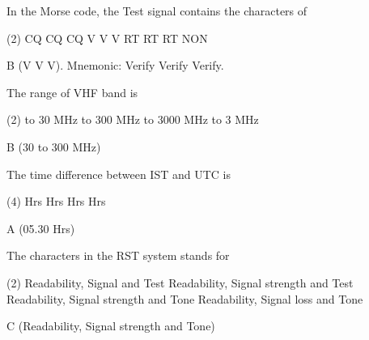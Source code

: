 \documentclass[a4paper]{article}
\begin{document}
\begin{question}In the Morse code, the Test signal contains the characters of \spaces
	\begin{tasks}(2)
		\task CQ CQ CQ
		\task V V V
		\task RT RT RT
		\task NON
	\end{tasks}
\end{question}

\begin{solution}
	B (V V V). Mnemonic: Verify Verify Verify.
\end{solution}

\vspace{5mm}



\begin{question}The range of VHF band is \spaces
	\begin{tasks}(2)
		 to 30 MHz
		 to 300 MHz
		 to 3000 MHz
		 to 3 MHz
	\end{tasks}
\end{question}

\begin{solution}
B (30 to 300 MHz)
\end{solution}

\vspace{5mm}



\begin{question}The time difference between IST and UTC is \spaces
	\begin{tasks}(4)
		 Hrs
		 Hrs
		 Hrs
		 Hrs
	\end{tasks}
\end{question}

\begin{solution}
A (05.30 Hrs)
\end{solution}

\vspace{5mm}



\begin{question}The characters in the RST system stands for \spaces
	\begin{tasks}(2)
		\task Readability, Signal and Test
		\task Readability, Signal strength and Test
		\task Readability, Signal strength and Tone
		\task Readability, Signal loss and Tone
	\end{tasks}
\end{question}

\begin{solution}
	C (Readability, Signal strength and Tone)
\end{solution}
\end{document}
